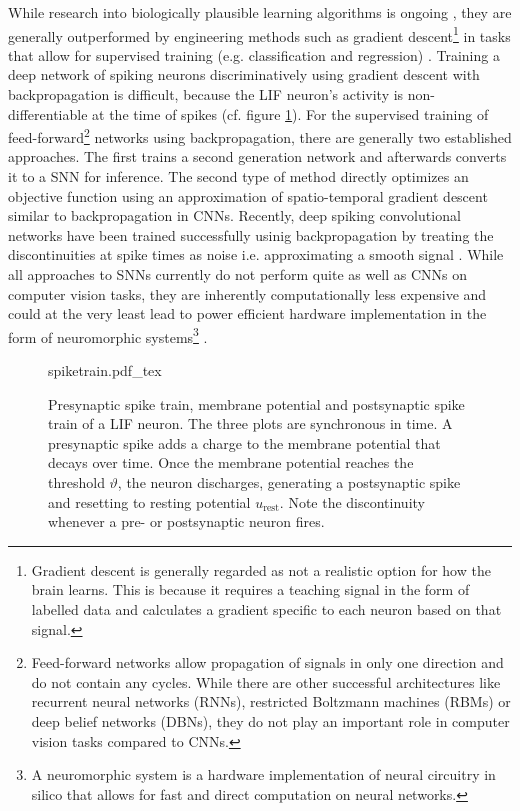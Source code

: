 While research into biologically plausible learning algorithms is ongoing \cite{bing2018survey,bartunov2018assessing}, they are generally outperformed by engineering methods such as gradient descent\footnote{Gradient descent is generally regarded as not a realistic option for how the brain learns. This is because it requires a teaching signal in the form of labelled data and calculates a gradient specific to each neuron based on that signal.} in tasks that allow for supervised training (e.g. classification and regression) \cite{diehl2015unsupervised}. Training a deep network of spiking neurons discriminatively using gradient descent with backpropagation is difficult, because the LIF neuron's activity is non-differentiable at the time of spikes (cf. figure \ref{fig:spiketrain}). For the supervised training of feed-forward\footnote{Feed-forward networks allow propagation of signals in only one direction and do not contain any cycles. While there are other successful architectures like recurrent neural networks (RNNs), restricted Boltzmann machines (RBMs) or deep belief networks (DBNs), they do not play an important role in computer vision tasks compared to CNNs.} networks using backpropagation, there are generally two established approaches. The first trains a second generation network and afterwards converts it to a SNN for inference. The second type of method directly optimizes an objective function using an approximation of spatio-temporal gradient descent similar to backpropagation in CNNs. Recently, deep spiking convolutional networks have been trained successfully usinig backpropagation by treating the discontinuities at spike times as noise i.e. approximating a smooth signal \cite{10.3389/fnins.2016.00508, panda2016unsupervised}. While all approaches to SNNs currently do not perform quite as well as CNNs on computer vision tasks, they are inherently computationally less expensive and could at the very least lead to power efficient hardware implementation in the form of neuromorphic systems\footnote{A neuromorphic system is a hardware implementation of neural circuitry in silico that allows for fast and direct computation on neural networks.} \cite{hopkins2018spiking}.
\begin{figure}
    \centering
\def\svgwidth{\textwidth}
{spiketrain.pdf_tex}
\caption[Presynaptic spike train, membrane potential and postsynaptic spike train of a LIF neuron]{Presynaptic spike train, membrane potential and postsynaptic spike train of a LIF neuron. The three plots are synchronous in time. A presynaptic spike adds a charge to the membrane potential that decays over time. Once the membrane potential reaches the threshold $\vartheta$, the neuron discharges, generating a postsynaptic spike and resetting to resting potential $u_\mathrm{rest}$. Note the discontinuity whenever a pre- or postsynaptic neuron fires.}\label{fig:spiketrain}
\end{figure}\noindent
